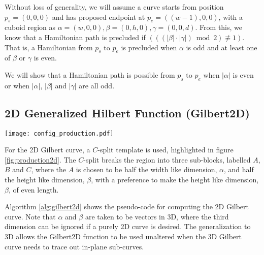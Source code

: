 Without loss of generality, we will assume a curve starts from position $p_s=(0,0,0)$ and has proposed
endpoint at $p_e=((w-1),0,0)$, with a cuboid region as $\alpha = (w,0,0), \beta = (0,h,0), \gamma = (0,0,d)$.
From this, we know that a Hamiltonian path is precluded if $( ((|\beta| \cdot |\gamma|) \bmod{2}) \not\equiv 1)$.
That is, a Hamiltonian from $p_s$ to $p_e$ is precluded when $\alpha$ is odd and at least one of $\beta$ or $\gamma$ is even.

We will show that a Hamiltonian path is possible from $p_s$ to $p_e$ when $|\alpha|$ is even or when $|\alpha|$, $|\beta|$ and $|\gamma|$
are all odd.




\subsection{2D Generalized Hilbert Function (Gilbert2D)}

\begin{figure*}[ht]
  \centering
  \texttt{[image: config\_production.pdf]}
  \caption{ Enumeration of the subdivision template depending on different parities of $\alpha$ and $\beta$ dimensions. }
  \label{fig:production2d}
\end{figure*}

For the 2D Gilbert curve, a $C$-split template is used, highlighted in figure \ref{fig:production2d}.
The $C$-split breaks the region into three sub-blocks, labelled $A$, $B$ and $C$, where the
$A$ is chosen to be half the width like dimension, $\alpha$, and half the height like dimension, $\beta$,
with a preference to make the height like dimension, $\beta$, of even length.

Algorithm \ref{alg:gilbert2d} shows the pseudo-code for computing the 2D Gilbert curve.
Note that $\alpha$ and $\beta$ are taken to be vectors in 3D, where the third dimension
can be ignored if a purely 2D curve is desired.
The generalization to 3D allows the Gilbert2D function to be used unaltered when the
3D Gilbert curve needs to trace out in-plane sub-curves.

